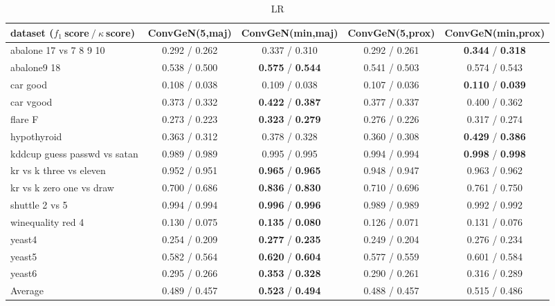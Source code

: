 

\begin{table*}[ht]\scriptsize\caption{LR}\label{tab:results:LR:A}\centering\tabularnewline
\begin{tabular}{l|@{\hskip3pt}c@{\hskip3pt}|@{\hskip3pt}c@{\hskip3pt}|@{\hskip3pt}c@{\hskip3pt}|@{\hskip3pt}c@{\hskip3pt}}\hline
\textbf{dataset ($f_1~$score$~/~\kappa~$score)} & \textbf{ConvGeN(5,maj)} & \textbf{ConvGeN(min,maj)} & \textbf{ConvGeN(5,prox)} & \textbf{ConvGeN(min,prox)}
\tabularnewline
\hline
abalone 17 vs 7 8 9 10 &  0.292  /  0.262  &  0.337  /  0.310  &  0.292  /  0.261  &  \textbf{0.344}  /  \textbf{0.318} 
\tabularnewline
abalone9 18 &  0.538  /  0.500  &  \textbf{0.575}  /  \textbf{0.544}  &  0.541  /  0.503  &  0.574  /  0.543 
\tabularnewline
car good &  0.108  /  0.038  &  0.109  /  0.038  &  0.107  /  0.036  &  \textbf{0.110}  /  \textbf{0.039} 
\tabularnewline
car vgood &  0.373  /  0.332  &  \textbf{0.422}  /  \textbf{0.387}  &  0.377  /  0.337  &  0.400  /  0.362 
\tabularnewline
flare F &  0.273  /  0.223  &  \textbf{0.323}  /  \textbf{0.279}  &  0.276  /  0.226  &  0.317  /  0.274 
\tabularnewline
hypothyroid &  0.363  /  0.312  &  0.378  /  0.328  &  0.360  /  0.308  &  \textbf{0.429}  /  \textbf{0.386} 
\tabularnewline
kddcup guess passwd vs satan &  0.989  /  0.989  &  0.995  /  0.995  &  0.994  /  0.994  &  \textbf{0.998}  /  \textbf{0.998} 
\tabularnewline
kr vs k three vs eleven &  0.952  /  0.951  &  \textbf{0.965}  /  \textbf{0.965}  &  0.948  /  0.947  &  0.963  /  0.962 
\tabularnewline
kr vs k zero one vs draw &  0.700  /  0.686  &  \textbf{0.836}  /  \textbf{0.830}  &  0.710  /  0.696  &  0.761  /  0.750 
\tabularnewline
shuttle 2 vs 5 &  0.994  /  0.994  &  \textbf{0.996}  /  \textbf{0.996}  &  0.989  /  0.989  &  0.992  /  0.992 
\tabularnewline
winequality red 4 &  0.130  /  0.075  &  \textbf{0.135}  /  \textbf{0.080}  &  0.126  /  0.071  &  0.131  /  0.076 
\tabularnewline
yeast4 &  0.254  /  0.209  &  \textbf{0.277}  /  \textbf{0.235}  &  0.249  /  0.204  &  0.276  /  0.234 
\tabularnewline
yeast5 &  0.582  /  0.564  &  \textbf{0.620}  /  \textbf{0.604}  &  0.577  /  0.559  &  0.601  /  0.584 
\tabularnewline
yeast6 &  0.295  /  0.266  &  \textbf{0.353}  /  \textbf{0.328}  &  0.290  /  0.261  &  0.316  /  0.289 
\tabularnewline
\hline Average &  0.489  /  0.457  &  \textbf{0.523}  /  \textbf{0.494}  &  0.488  /  0.457  &  0.515  /  0.486 
\tabularnewline
\hline\end{tabular}\end{table*}


